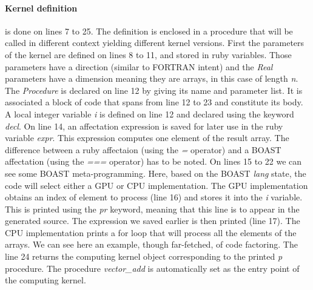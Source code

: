 \paragraph{Kernel definition} is done on lines 7 to 25.
The definition is enclosed in a procedure that will be called in different context yielding different kernel versions.
First the parameters of the kernel are defined on lines 8 to 11, and stored in ruby variables.
Those parameters have a direction (similar to FORTRAN intent) and the \emph{Real} parameters have a dimension meaning they are arrays, in this case of length \emph{n}.
The \emph{Procedure} is declared on line 12 by giving its name and parameter list.
It is associated a block of code that spans from line 12 to 23 and constitute its body.
A local integer variable \emph{i} is defined on line 12 and declared using the keyword \emph{decl}.
On line 14, an affectation expression is saved for later use in the ruby variable \emph{expr}.
This expression computes one element of the result array.
The difference between a ruby affectaion (using the \emph{=} operator) and a BOAST affectation (using the \emph{===} operator) has to be noted.
On lines 15 to 22 we can see some BOAST meta-programming.
Here, based on the BOAST \emph{lang} state, the code will select either a GPU or CPU implementation.
The GPU implementation obtains an index of element to process (line 16) and stores it into the \emph{i} variable.
This is printed using the \emph{pr} keyword, meaning that this line is to appear in the generated source.
The expression we saved earlier is then printed (line 17).
The CPU implementation prints a for loop that will process all the elements of the arrays.
We can see here an example, though far-fetched, of code factoring.
The line 24 returns the computing kernel object corresponding to the printed \emph{p} procedure.
The procedure \emph{vector\_add} is automatically set as the entry point of the computing kernel.

